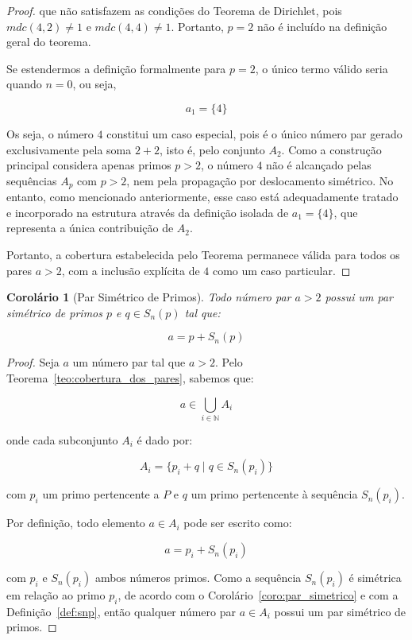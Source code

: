 \documentclass[a4paper,11pt]{article}
\newtheorem{corollary}[theorem]{Corolário}
\theoremstyle{definition}
\theoremstyle{remark}
\begin{document}
\begin{otherlanguage}{brazil}
\begin{proof}
		que não satisfazem as condições do Teorema de Dirichlet, pois \(mdc(4,2) \neq 1\) e \(mdc(4,4) \neq 1\). Portanto, \(p = 2\) não é incluído na definição geral do teorema.
		
		Se estendermos a definição formalmente para \(p = 2\), o único termo válido seria quando \(n = 0\), ou seja,
		
		\[
		a_1 = \{4\}
		\]
		
		Os seja, o número \(4\) constitui um caso especial, pois é o único número par gerado exclusivamente pela soma \(2 + 2\), isto é, pelo conjunto \(A_2\). Como a construção principal considera apenas primos \(p > 2\), o número \(4\) não é alcançado pelas sequências \(A_p\) com \(p > 2\), nem pela propagação por deslocamento simétrico. No entanto, como mencionado anteriormente, esse caso está adequadamente tratado e incorporado na estrutura através da definição isolada de \(a_1 = \{4\}\), que representa a única contribuição de \(A_2\).
		
		Portanto, a cobertura estabelecida pelo Teorema permanece válida para todos os pares \(a > 2\), com a inclusão explícita de \(4\) como um caso particular.
		
	\end{proof}
	

	\begin{corollary}[Par Simétrico de Primos]\label{coro:par_simetrico_primos}
		Todo número par \(a > 2\) possui um par simétrico de primos \(p\) e \(q \in S_n(p)\) tal que:
		
		\[
		a = p + S_n(p)
		\]
	\end{corollary}
	
	\begin{proof}
		Seja \(a\) um número par tal que \(a > 2\). Pelo Teorema~\ref{teo:cobertura_dos_pares}, sabemos que:
		
		\[
		a \in \bigcup_{i \in \mathbb{N}} A_i
		\]
		
		onde cada subconjunto \(A_i\) é dado por:
		
		\[
		A_i = \{p_i + q \mid q \in S_n(p_i)\}
		\]
		
		com \(p_i\) um primo pertencente a \(P\) e \(q\) um primo pertencente à sequência \(S_n(p_i)\).
		
		Por definição, todo elemento \(a \in A_i\) pode ser escrito como:
		
		\[
		a = p_i + S_n(p_i)
		\]
		
		com \(p_i\) e \(S_n(p_i)\) ambos números primos. Como a sequência \(S_n(p_i)\) é simétrica em relação ao primo \(p_i\), de acordo com o Corolário~\ref{coro:par_simetrico} e com a Definição~\ref{def:snp}, então qualquer número par \(a \in A_i\) possui um par simétrico de primos.
		

\end{proof}
\end{otherlanguage}
\end{document}
